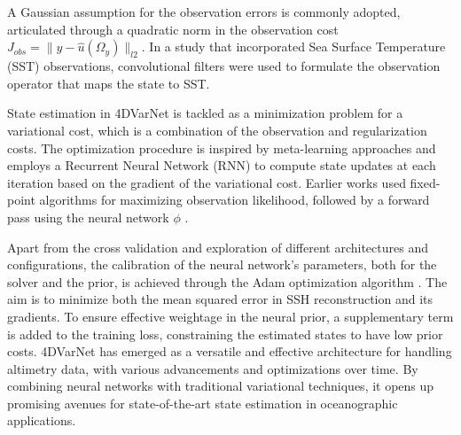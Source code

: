 \begin{bibunit}
A Gaussian assumption for the observation errors is commonly adopted, articulated through a quadratic norm in the observation cost $J_{obs}= \|y - \hat{u}(\Omega_y)\|_{l2}$. In a study that incorporated Sea Surface Temperature (SST) observations\cite{fabletMultimodal4DVarNetsReconstruction2023}, convolutional filters were used to formulate the observation operator that maps the state to SST.


State estimation in 4DVarNet is tackled as a minimization problem for a variational cost, which is a combination of the observation and regularization costs. The optimization procedure is inspired by meta-learning approaches and employs a Recurrent Neural Network (RNN) to compute state updates at each iteration based on the gradient of the variational cost\cite{fabletENDTOENDPHYSICSINFORMEDREPRESENTATION2021}. Earlier works used fixed-point algorithms for maximizing observation likelihood, followed by a forward pass using the neural network $\phi$ \cite{beauchampDatadrivenLearningbasedInterpolations2021}. 

Apart from the cross validation and exploration of different architectures and configurations, the calibration of the neural network's parameters, both for the solver and the prior, is achieved through the Adam optimization algorithm \cite{kingmaAdamMethodStochastic2017}. The aim is to minimize both the mean squared error in SSH reconstruction and its gradients. To ensure effective weightage in the neural prior, a supplementary term is added to the training loss, constraining the estimated states to have low prior costs.
4DVarNet has emerged as a versatile and effective architecture for handling altimetry data, with various advancements and optimizations over time. By combining neural networks with traditional variational techniques, it opens up promising avenues for state-of-the-art state estimation in oceanographic applications.

\end{bibunit}


